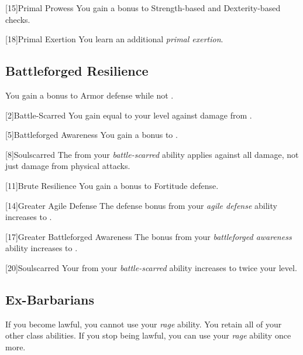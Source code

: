         [15]{Primal Prowess}
        You gain a  bonus to Strength-based and Dexterity-based checks.

        [18]{Primal Exertion}
        You learn an additional \textit{primal exertion}.

    \subsection{Battleforged Resilience}
         You gain a  bonus to Armor defense while not .

        [2]{Battle-Scarred} You gain  equal to your level against damage from .

        [5]{Battleforged Awareness} You gain a  bonus to .

        [8]{Soulscarred} The  from your \textit{battle-scarred} ability applies against all damage, not just damage from physical attacks.

        [11]{Brute Resilience}
        You gain a  bonus to Fortitude defense.

        [14]{Greater Agile Defense}
        The defense bonus from your \textit{agile defense} ability increases to .

        [17]{Greater Battleforged Awareness}
        The bonus from your \textit{battleforged awareness} ability increases to .

        [20]{Soulscarred}
        Your  from your \textit{battle-scarred} ability increases to twice your level.

    \subsection{Ex-Barbarians}
        If you become lawful, you cannot use your \textit{rage} ability.
        You retain all of your other class abilities.
        If you stop being lawful, you can use your \textit{rage} ability once more.

